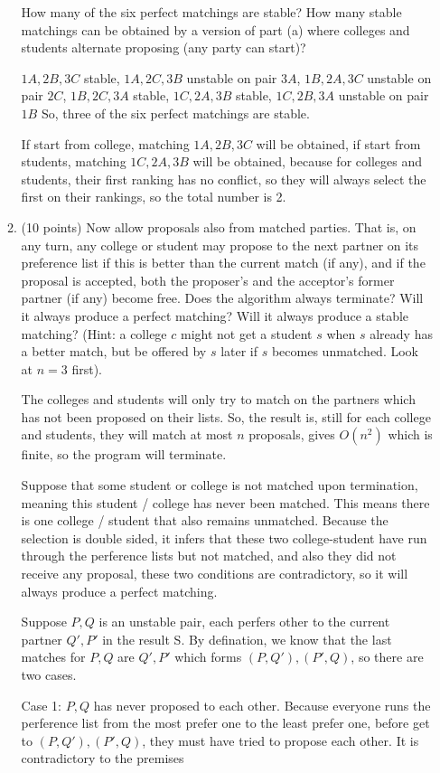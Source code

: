 \documentclass{article}
\begin{document}
\begin{enumerate}[topsep=0pt]
\begin{enumerate}
How many of the six perfect matchings are stable? How many stable matchings can be obtained by a version of part (a) where colleges and students alternate proposing (any party can start)?

$1A,2B,3C$ stable, $1A,2C,3B$ unstable on pair $3A$, $1B,2A,3C$ unstable on pair $2C$, $1B,2C,3A$ stable, $1C,2A,3B$ stable, $1C,2B,3A$ unstable on pair $1B$
So, three of the six perfect matchings are stable.

If start from college, matching $1A,2B,3C$ will be obtained, if start from students, matching $1C,2A,3B$ will be obtained, because for colleges and students, their first ranking has no conflict, so they will always select the first on their rankings, so the total number is 2.

\item (10 points) Now allow proposals also from matched parties. That is, on any turn, any college or student may propose to the next partner on its preference list if this is better than the current match (if any), and if the proposal is accepted, both the proposer's and the acceptor's former partner (if any) become free. Does the algorithm always terminate? Will it always produce a perfect matching? Will it always produce a stable matching? (Hint: a college $c$ might not get a student $s$ when $s$ already has a better match, but be offered by $s$ later if $s$ becomes unmatched. Look at $n=3$ first).
  
The colleges and students will only try to match on the partners which has not been proposed on their lists. So, the result is, still for each college and students, they will match at most $n$ proposals, gives $O(n^2)$ which is finite, so the program will terminate.

Suppose that some student or college is not matched upon termination, meaning this student / college has never been matched. This means there is one college / student that also remains unmatched. Because the selection is double sided, it infers that these two college-student have run through the perference lists but not matched, and also they did not receive any proposal, these two conditions are contradictory, so it will always produce a perfect matching.

Suppose $P,Q$ is an unstable pair, each perfers other to the current partner $Q',P'$ in the result S.
By defination, we know that the last matches for $P,Q$ are $Q',P'$ which forms $(P,Q'),(P',Q)$, so there are two cases.

Case 1: $P,Q$ has never proposed to each other. 
  Because everyone runs the perference list from the most prefer one to the least prefer one, before get to $(P,Q'),(P',Q)$, they must have tried to propose each other. It is contradictory to the premises


\end{enumerate}
\end{enumerate}
\end{document}
